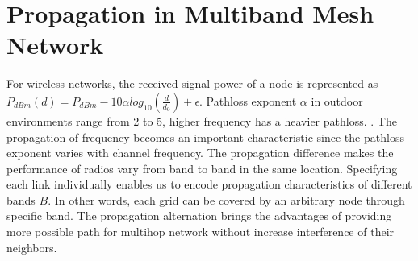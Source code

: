 \section{Propagation in Multiband Mesh Network}
\label{sec:propogation}




 For wireless networks, the received signal power of a node is represented as $P_{dBm}(d)=P_{dBm}-10\alpha log_{10}(\frac{d}{d_0})+\epsilon$. Pathloss exponent $\alpha$ in outdoor environments range from 2 to 5, higher frequency has a heavier pathloss. \cite{camp2006measurement}. 
The propagation of frequency becomes an important characteristic since the pathloss exponent varies with channel frequency. The propagation difference makes the performance of radios vary from band to band in the same location. 
Specifying each link individually enables us to encode propagation characteristics of different bands $B$. In other words, each grid can be covered by an arbitrary node through specific band.  
The propagation alternation brings the advantages of providing more possible path for multihop network without increase interference of their neighbors. 


